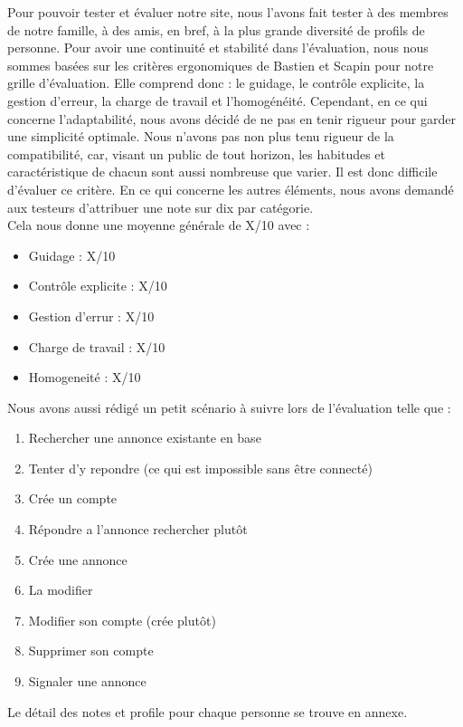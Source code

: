 \documentclass[a4paper,11pt]{article}
\begin{document}
Pour pouvoir tester et évaluer notre site, nous l'avons fait tester à des membres de notre famille, à des amis, en bref, à la plus grande diversité de profils de personne. Pour avoir une continuité et stabilité dans l'évaluation, nous nous sommes basées sur les critères ergonomiques de Bastien et Scapin pour notre grille d'évaluation. Elle comprend donc : le guidage, le contrôle explicite, la gestion d'erreur, la charge de travail et l'homogénéité. Cependant, en ce qui concerne l'adaptabilité, nous avons décidé de ne pas en tenir rigueur pour garder une simplicité optimale. Nous n'avons pas non plus tenu rigueur de la compatibilité, car, visant un public de tout horizon, les habitudes et caractéristique de chacun sont aussi nombreuse que varier. Il est donc difficile d'évaluer ce critère. En ce qui concerne les autres éléments, nous avons demandé aux testeurs d'attribuer une note sur dix par catégorie.\\
Cela nous donne une moyenne générale de X/10 avec :\\
\begin{itemize}
  \item Guidage : X/10
  \item Contrôle explicite : X/10
  \item Gestion d'errur : X/10
  \item Charge de travail : X/10
  \item Homogeneité : X/10
\end{itemize}

Nous avons aussi rédigé un petit scénario à suivre lors de l'évaluation telle que :
\begin{enumerate}
  \item Rechercher une annonce existante en base
  \item Tenter d'y repondre (ce qui est impossible sans être connecté)
  \item Crée un compte
  \item Répondre a l'annonce rechercher plutôt
  \item Crée une annonce
  \item La modifier
  \item Modifier son compte (crée plutôt)
  \item Supprimer son compte
  \item Signaler une annonce
\end{enumerate}

Le détail des notes et profile pour chaque personne se trouve en annexe.

\end{document}
